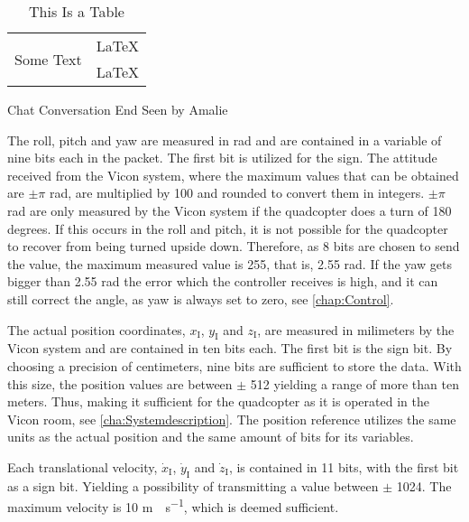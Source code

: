 \begin{table}[H]
    \begin{tabular}{|l|l|}
        \hline %
        \multirow{2}{2cm}{Some Text}  & \LaTeX                      \\
        & \LaTeX                         \\
        \hline %
    \end{tabular}
    \caption{This Is a Table}
\end{table}
Chat Conversation End
Seen by Amalie

The roll, pitch and yaw are measured in rad and are contained in a variable of nine bits each in the packet. The first bit is utilized for the sign. The attitude received from the Vicon system, where the maximum values that can be obtained are $\pm\pi$ rad, are multiplied by 100 and rounded to convert them in integers. $\pm\pi$ rad are only measured by the Vicon system if the quadcopter does a turn of 180 degrees. If this occurs in the roll and pitch, it is not possible for the quadcopter to recover from being turned upside down. Therefore, as 8 bits are chosen to send the value, the maximum measured value is 255, that is, 2.55 rad. If the yaw gets bigger than 2.55 rad the error which the controller receives is high, and it can still correct the angle, as yaw is always set to zero, see \autoref{chap:Control}.

The actual position coordinates, $x_{\mathrm{I}}$, $y_{\mathrm{I}}$ and $z_{\mathrm{I}}$, are measured in milimeters by the Vicon system and are contained in ten bits each. The first bit is the sign bit. By choosing a precision of centimeters, nine bits are sufficient to store the data. With this size, the position values are between $\pm$ 512 yielding a range of more than ten meters. Thus, making it sufficient for the quadcopter as it is operated in the Vicon room, see \autoref{cha:Systemdescription}. The position reference utilizes the same units as the actual position and the same amount of bits for its variables.

Each translational velocity, $\dot{x}_{\mathrm{I}}$, $\dot{y}_{\mathrm{I}}$ and $\dot{z}_{\mathrm{I}}$, is contained in 11 bits, with the first bit as a sign bit. Yielding a possibility of transmitting a value between $\pm$ 1024. The maximum velocity is 10 \si{m \cdot s^{-1}}, which is deemed sufficient.

